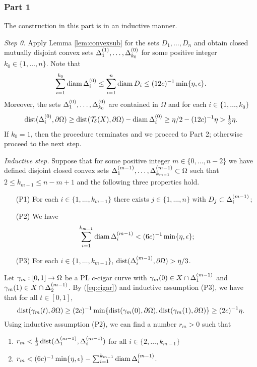 \documentclass{amsart}
\DeclareMathOperator{\dist}{dist}
\begin{document}
\subsubsection{Part 1}

The construction in this part is in an inductive manner.

\emph{Step 0.} Apply Lemma \ref{lem:convexsub} for the sets $D_1,\dots,D_n$ and obtain closed mutually disjoint convex sets $\Delta_1^{(1)},\dots,\Delta_{k_0}^{(0)}$ for some positive integer $k_0\in \{1,\dots,n\}$. Note that 
\begin{align*} 
\sum_{i=1}^{k_0} \operatorname{diam}{\Delta^{(0)}_i} \leq \sum_{i=1}^{n} \operatorname{diam}{D_i} \leq (12c)^{-1}\min\{\eta,\epsilon\}.
\end{align*}
Moreover, the sets $\Delta_1^{(0)},\dots,\Delta_{k_0}^{(0)}$ are contained in $\Omega$ and for each $i\in\{1,\dots,k_0\}$
\begin{align*} 
\dist(\D_i^{(0)},\partial\Omega) \geq \dist(\mathcal{T}_{\d}(X),\partial\Omega) - \diam{\D_i^{(0)}} \geq \eta/2 - (12c)^{-1}\eta >\tfrac13 \eta.
\end{align*}
If $k_0 = 1$, then the procedure terminates and we proceed to Part 2; otherwise proceed to the next step.


\emph{Inductive step.} Suppose that for some positive integer $m \in \{0,\dots,n-2\}$ we have defined disjoint closed convex sets $\Delta^{(m-1)}_{1},\dots, \Delta^{(m-1)}_{k_{m-1}} \subset \Omega$ such that $2 \leq k_{m-1} \leq n-m+1$ and the following three properties hold.
\begin{enumerate}
\item[(P1)] For each $i\in \{1,\dots,k_{m-1}\}$ there exists $j\in\{1,\dots,n\}$ with $D_{j} \subset \Delta^{(m-1)}_{i}$;
\item[(P2)] We have \[ \sum_{i=1}^{k_{m-1}} \operatorname{diam}{\Delta^{(m-1)}_{i}} < (6c)^{-1}\min\{\eta,\epsilon\};\]
\item[(P3)]  For each $i\in \{1,\dots, k_{m-1}\}$, $\dist(\D_i^{(m-1)},\partial\Omega) > \eta/3$.
\end{enumerate}

Let $\gamma_{m}:[0,1] \to \Omega$ be a PL $c$-cigar curve with $\gamma_m(0)\in X\cap \Delta_{1}^{(m-1)}$ and $\gamma_m(1) \in X\cap \Delta^{(m-1)}_2$. By (\ref{eq:cigar}) and inductive assumption (P3), we have that for all $t\in [0,1]$, 
\begin{equation}\label{eq:gamma}
\dist(\g_m(t),\partial\Omega) \geq (2c)^{-1}\min\{\dist(\g_m(0),\partial\Omega),\dist(\g_m(1),\partial\Omega)\} 
\geq (2c)^{-1}\eta.
\end{equation}
Using inductive assumption (P2), we can find a number $r_m>0$ such that
\begin{enumerate}
\item $r_m < \tfrac13\dist(\D^{(m-1)}_{1},\D^{(m-1)}_i)$ for all $i\in\{2,\dots,k_{m-1}\}$
\item $r_m < (6c)^{-1}\min\{\eta,\epsilon\} -  \sum_{i=1}^{k_{m-1}} \operatorname{diam}{\Delta^{(m-1)}_{i}}$.
\end{enumerate}
\end{document}
